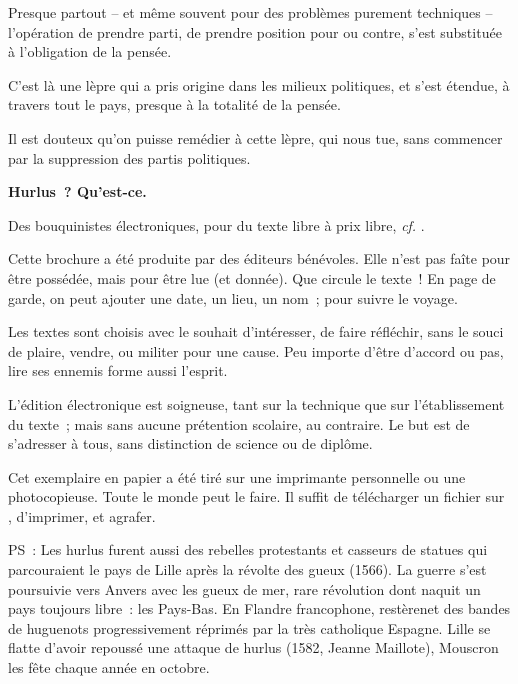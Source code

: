 \documentclass[french,twoside]{book} %
\begin{document}
Presque partout – et même souvent pour des problèmes purement techniques – l’opération de prendre parti, de prendre position pour ou contre, s’est substituée à l’obligation de la pensée.\par
C’est là une lèpre qui a pris origine dans les milieux politiques, et s’est étendue, à travers tout le pays, presque à la totalité de la pensée.\par
Il est douteux qu’on puisse remédier à cette lèpre, qui nous tue, sans commencer par la suppression des partis politiques.
 


\ifbooklet
  \clearpage
  \pagestyle{empty}
  \hbox{}\newpage
  \ifodd\value{page}\hbox{}\newpage\fi
  {\centering\color{rubric}\bfseries\noindent\large
    Hurlus ? Qu’est-ce.\par
    \bigskip
  }
  \noindent Des bouquinistes électroniques, pour du texte libre à prix libre,
  \textit{cf.} \href{https://hurlus.fr}{}.\par
  \bigskip
  \noindent Cette brochure a été produite par des éditeurs bénévoles.
  Elle n’est pas faîte pour être possédée, mais pour être lue (et donnée).
  Que circule le texte !
  En page de garde, on peut ajouter une date, un lieu, un nom ;
  pour suivre le voyage.
  \par

  Les textes sont choisis avec le souhait d’intéresser, de faire réfléchir,
  sans le souci de plaire, vendre, ou militer pour une cause.
  Peu importe d’être d’accord ou pas, lire ses ennemis forme aussi l’esprit.
  \par

  L’édition électronique est soigneuse, tant sur la technique
  que sur l’établissement du texte ; mais sans aucune prétention scolaire, au contraire.
  Le but est de s’adresser à tous, sans distinction de science ou de diplôme.
  \par

  Cet exemplaire en papier a été tiré sur une imprimante personnelle
   ou une photocopieuse. Toute le monde peut le faire.
  Il suffit de
  télécharger un fichier sur \href{https://hurlus.fr}{},
  d’imprimer, et agrafer.\par

  \bigskip

  \noindent PS : Les hurlus furent aussi des rebelles protestants et casseurs de statues qui parcouraient le pays de Lille après la révolte des gueux (1566). La guerre s’est poursuivie vers Anvers avec les gueux de mer, rare révolution dont naquit un pays toujours libre : les Pays-Bas.
  En Flandre francophone, restèrenet des bandes de huguenots progressivement réprimés par la très catholique Espagne.
  Lille se flatte d’avoir repoussé une attaque de hurlus (1582, Jeanne Maillote), Mouscron les fête chaque année en octobre.
\fi
\end{document}
